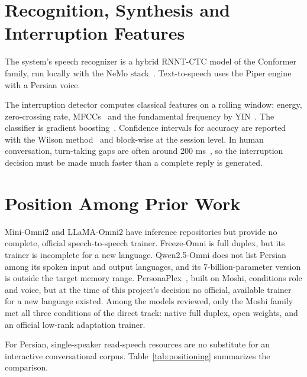 \section{Recognition, Synthesis and Interruption Features}

The system's speech recognizer is a hybrid RNNT-CTC model of the Conformer
family, run locally with the NeMo stack~\cite{kuchaiev2019nemo}. Text-to-speech
uses the Piper engine~\cite{piper2023} with a Persian voice.

The interruption detector computes classical features on a rolling window:
energy, zero-crossing rate, MFCCs~\cite{davis1980mfcc} and the fundamental
frequency by YIN~\cite{decheveigne2002yin}. The classifier is gradient
boosting~\cite{friedman2001gbm}. Confidence intervals for accuracy are reported
with the Wilson method~\cite{wilson1927interval} and block-wise at the session
level. In human conversation, turn-taking gaps are often around
200 ms~\cite{skantze2021turntaking}, so the interruption decision must be made
much faster than a complete reply is generated.

\section{Position Among Prior Work}
\label{sec:positioning}

Mini-Omni2 and LLaMA-Omni2 have inference repositories but provide no complete,
official speech-to-speech trainer. Freeze-Omni is full duplex, but its trainer
is incomplete for a new language. Qwen2.5-Omni does not list Persian among its
spoken input and output languages, and its 7-billion-parameter version is
outside the target memory range. PersonaPlex~\cite{roy2026personaplex},
built on Moshi, conditions role and voice, but at the time of this project's
decision no official, available trainer for a new language existed. Among the
models reviewed, only the Moshi family met all three conditions of the direct
track: native full duplex, open weights, and an official low-rank adaptation
trainer.

For Persian, single-speaker read-speech resources are no substitute for an
interactive conversational corpus. Table~\ref{tab:positioning} summarizes the
comparison.

